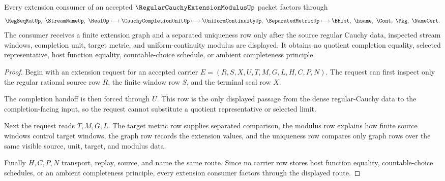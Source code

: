 \begin{theorem}
\label{thm:regular-cauchy-extension-modulus-factorization}
Every extension consumer of an accepted $\RegularCauchyExtensionModulusUp$ packet factors through
$$
\RegSeqRatUp,\ \StreamNameUp,\ \RealUp
\longmapsto
\CauchyCompletionUnitUp
\longmapsto
\UniformContinuityUp,\ \SeparatedMetricUp
\longmapsto
\BHist,\ \hsame,\ \Cont,\ \Pkg,\ \NameCert .
$$
The consumer receives a finite extension graph and a separated uniqueness row only after the source regular Cauchy data, inspected stream windows, completion unit, target metric, and uniform-continuity modulus are displayed. It obtains no quotient completion equality, selected representative, host function equality, countable-choice schedule, or ambient completeness principle.
\end{theorem}
\begin{proof}
Begin with an extension request for an accepted carrier $E=(R,S,X,U,T,M,G,L,H,C,P,N)$. The request can first inspect only the regular rational source row $R$, the finite window row $S$, and the terminal seal row $X$.

The completion handoff is then forced through $U$. This row is the only displayed passage from the dense regular-Cauchy data to the completion-facing input, so the request cannot substitute a quotient representative or selected limit.

Next the request reads $T,M,G,L$. The target metric row supplies separated comparison, the modulus row explains how finite source windows control target windows, the graph row records the extension values, and the uniqueness row compares only graph rows over the same visible source, unit, target, and modulus data.

Finally $H,C,P,N$ transport, replay, source, and name the same route. Since no carrier row stores host function equality, countable-choice schedules, or an ambient completeness principle, every extension consumer factors through the displayed route.
\end{proof}



